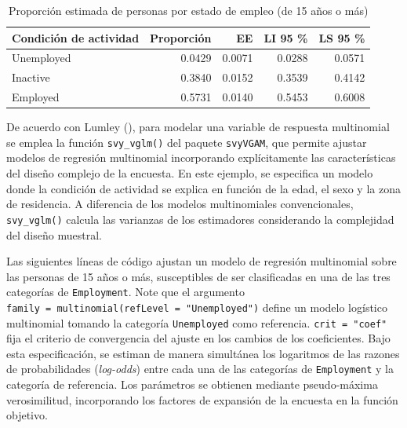 \documentclass[
  spanish,
  11pt,
  letterpaper,
  oneside,
  open=any]{scrbook}
\begin{document}
{

\begin{longtable}[]{@{}lrrrr@{}}

\caption{\label{tbl-prop-empleo-15}Proporción estimada de personas por
estado de empleo (de 15 años o más)}

\tabularnewline

\toprule\noalign{}
Condición de actividad & Proporción & EE & LI 95 \% & LS 95 \% \\
\midrule\noalign{}
\endhead
\bottomrule\noalign{}
\endlastfoot
Unemployed & 0.0429 & 0.0071 & 0.0288 & 0.0571 \\
Inactive & 0.3840 & 0.0152 & 0.3539 & 0.4142 \\
Employed & 0.5731 & 0.0140 & 0.5453 & 0.6008 \\

\end{longtable}

}

De acuerdo con Lumley (), para modelar
una variable de respuesta multinomial se emplea la función
\texttt{svy\_vglm()} del paquete \texttt{svyVGAM}, que permite ajustar
modelos de regresión multinomial incorporando explícitamente las
características del diseño complejo de la encuesta. En este ejemplo, se
especifica un modelo donde la condición de actividad se explica en
función de la edad, el sexo y la zona de residencia. A diferencia de los
modelos multinomiales convencionales, \texttt{svy\_vglm()} calcula las
varianzas de los estimadores considerando la complejidad del diseño
muestral.

Las siguientes líneas de código ajustan un modelo de regresión
multinomial sobre las personas de 15 años o más, susceptibles de ser
clasificadas en una de las tres categorías de \texttt{Employment}. Note
que el argumento
\texttt{family\ =\ multinomial(refLevel\ =\ "Unemployed")} define un
modelo logístico multinomial tomando la categoría \texttt{Unemployed}
como referencia. \texttt{crit\ =\ "coef"} fija el criterio de
convergencia del ajuste en los cambios de los coeficientes. Bajo esta
especificación, se estiman de manera simultánea los logaritmos de las
razones de probabilidades (\emph{log-odds}) entre cada una de las
categorías de \texttt{Employment} y la categoría de referencia. Los
parámetros se obtienen mediante pseudo-máxima verosimilitud,
incorporando los factores de expansión de la encuesta en la función
objetivo.
\end{document}

